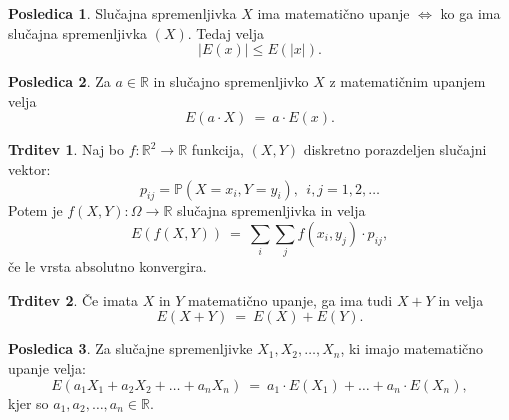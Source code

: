 \documentclass[11pt]{article}
\theoremstyle{definition}
\theoremstyle{definition}
\newtheorem{trditev}{Trditev}[section]
\theoremstyle{definition}
\newtheorem*{posledica}{Posledica}
\begin{document}
\begin{posledica}

Slučajna spremenljivka $X$ ima matematično upanje $\Leftrightarrow$ ko ga ima slučajna spremenljivka $(X)$. Tedaj velja
$$|E(x)| \leq E(|x|).$$

\end{posledica}
\vspace{0.5cm}

\begin{posledica}

Za $a \in \mathbb{R}$ in slučajno spremenljivko $X$ z matematičnim upanjem velja
$$E(a \cdot X) ~=~ a \cdot E(x).$$ 

\end{posledica}
\vspace{0.5cm}

\begin{trditev}

Naj bo $f: \mathbb{R}^2 \rightarrow \mathbb{R}$ funkcija, $(X, Y)$ diskretno porazdeljen slučajni vektor:
$$p_{ij} = \mathbb{P}(X = x_i, Y = y_i), ~~i,j = 1, 2, \ldots$$
Potem je $f(X, Y): \Omega \rightarrow \mathbb{R}$ slučajna spremenljivka in velja
$$E(f(X, Y)) ~=~ \sum_i \sum_j f(x_i, y_j) \cdot p_{ij},$$
če le vrsta absolutno konvergira.

\end{trditev}
\vspace{0.5cm}

\begin{trditev}

Če imata $X$ in $Y$ matematično upanje, ga ima tudi $X + Y$ in velja
$$E(X + Y) ~=~ E(X) + E(Y).$$

\end{trditev}
\vspace{0.5cm}

\begin{posledica}

Za slučajne spremenljivke $X_1, X_2, \ldots, X_n$, ki imajo matematično upanje velja:
$$E(a_1 X_1 + a_2 X_2 + \ldots + a_n X_n) ~=~ a_1 \cdot E(X_1) + \ldots + a_n \cdot E(X_n),$$
kjer so $a_1, a_2, \ldots, a_n \in \mathbb{R}$.

\end{posledica}
\vspace{0.5cm}

\end{document}
